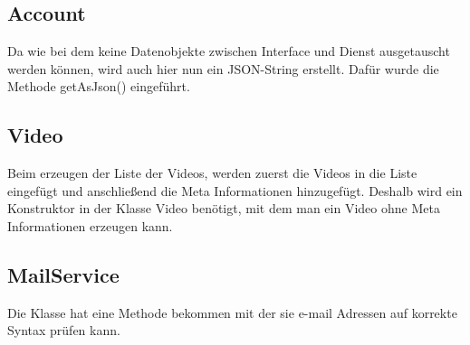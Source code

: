 \subsection{Account}
Da wie bei dem  keine Datenobjekte zwischen Interface und Dienst ausgetauscht werden können, wird auch hier nun ein JSON-String erstellt. Dafür wurde die Methode getAsJson() eingeführt.

\subsection{Video}
Beim erzeugen der Liste der Videos, werden zuerst die Videos in die Liste eingefügt und anschließend die Meta Informationen hinzugefügt. Deshalb wird ein Konstruktor in der Klasse Video benötigt, mit dem man ein Video ohne Meta Informationen erzeugen kann.

\subsection{MailService}
Die Klasse hat eine Methode bekommen mit der sie e-mail Adressen auf korrekte Syntax prüfen kann.